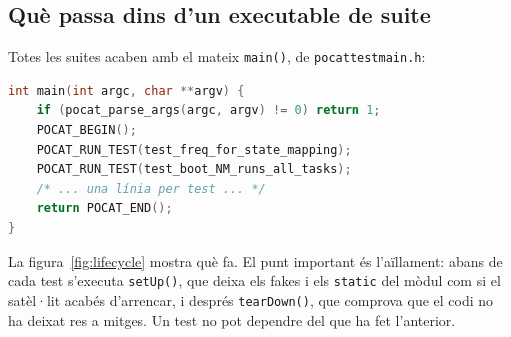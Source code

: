 \documentclass[11pt,a4paper]{article}
\DeclareRobustCommand{\_}{\textunderscore\allowbreak}
\newcommand{\cd}[1]{\texttt{#1}}
\begin{document}
\subsection{Què passa dins d'un executable de suite}

Totes les suites acaben amb el mateix \cd{main()}, de \cd{pocat\_test\_main.h}:
\begin{lstlisting}[language=C]
int main(int argc, char **argv) {
    if (pocat_parse_args(argc, argv) != 0) return 1;
    POCAT_BEGIN();
    POCAT_RUN_TEST(test_freq_for_state_mapping);
    POCAT_RUN_TEST(test_boot_NM_runs_all_tasks);
    /* ... una línia per test ... */
    return POCAT_END();
}
\end{lstlisting}
La figura~\ref{fig:lifecycle} mostra què fa. El punt important és l'aïllament: abans de
cada test s'executa \cd{setUp()}, que deixa els fakes i els \cd{static} del mòdul com si
el satèl·lit acabés d'arrencar, i després \cd{tearDown()}, que comprova que el codi no ha
deixat res a mitges. Un test no pot dependre del que ha fet l'anterior.
\end{document}

